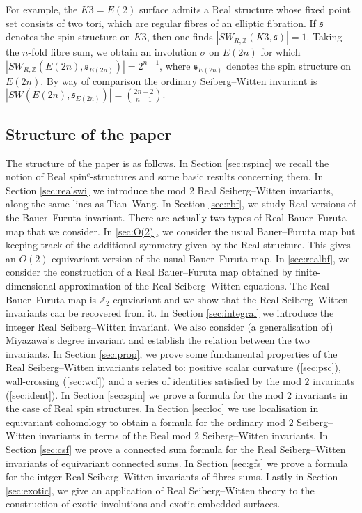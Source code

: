 \documentclass{amsart}
\theoremstyle{definition}
\theoremstyle{remark}
\numberwithin{equation}{section}
\begin{document}
For example, the $K3 = E(2)$ surface admits a Real structure whose fixed point set consists of two tori, which are regular fibres of an elliptic fibration. If $\mathfrak{s}$ denotes the spin structure on $K3$, then one finds $| SW_{R,\mathbb{Z}}( K3 , \mathfrak{s}) | = 1$. Taking the $n$-fold fibre sum, we obtain an involution $\sigma$ on $E(2n)$ for which $| SW_{R,\mathbb{Z}}( E(2n) , \mathfrak{s}_{E(2n)} ) | = 2^{n-1}$, where $\mathfrak{s}_{E(2n)}$ denotes the spin structure on $E(2n)$. By way of comparison the ordinary Seiberg--Witten invariant is $|SW(E(2n) , \mathfrak{s}_{E(2n)})| = \binom{ 2n-2}{n-1}$.




\subsection{Structure of the paper}

The structure of the paper is as follows. In Section \ref{sec:rspinc} we recall the notion of Real spin$^c$-structures and some basic results concerning them. In Section \ref{sec:realswi} we introduce the mod $2$ Real Seiberg--Witten invariants, along the same lines as Tian--Wang. In Section \ref{sec:rbf}, we study Real versions of the Bauer--Furuta invariant. There are actually two types of Real Bauer--Furuta map that we consider. In \textsection \ref{sec:O(2)}, we consider the usual Bauer--Furuta map but keeping track of the additional symmetry given by the Real structure. This gives an $O(2)$-equivariant version of the usual Bauer--Furuta map. In \textsection \ref{sec:realbf}, we consider the construction of a Real Bauer--Furuta map obtained by finite-dimensional approximation of the Real Seiberg--Witten equations. The Real Bauer--Furuta map is $\mathbb{Z}_2$-equviariant and we show that the Real Seiberg--Witten invariants can be recovered from it. In Section \ref{sec:integral} we introduce the integer Real Seiberg--Witten invariant. We also consider (a generalisation of) Miyazawa's degree invariant and establish the relation between the two invariants. In Section \ref{sec:prop}, we prove some fundamental properties of the Real Seiberg--Witten invariants related to: positive scalar curvature (\textsection \ref{sec:psc}), wall-crossing (\textsection \ref{sec:wcf}) and a series of identities satisfied by the mod $2$ invariants (\textsection \ref{sec:ident}). In Section \ref{sec:spin} we prove a formula for the mod $2$ invariants in the case of Real spin structures. In Section \ref{sec:loc} we use localisation in equivariant cohomology to obtain a formula for the ordinary mod $2$ Seiberg--Witten invariants in terms of the Real mod $2$ Seiberg--Witten invariants. In Section \ref{sec:csf} we prove a connected sum formula for the Real Seiberg--Witten invariants of equivariant connected sums. In Section \ref{sec:gfs} we prove a formula for the intger Real Seiberg--Witten invariants of fibres sums. Lastly in Section \ref{sec:exotic}, we give an application of Real Seiberg--Witten theory to the construction of exotic involutions and exotic embedded surfaces.
\end{document}
